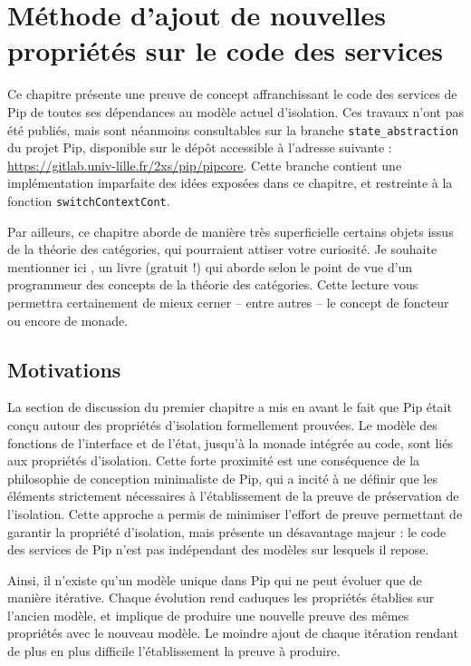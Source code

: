 \chapter{Méthode d'ajout de nouvelles propriétés sur le code des services}

	Ce chapitre présente une preuve de concept affranchissant le code des services de Pip de toutes ses dépendances au modèle actuel d'isolation. Ces travaux n'ont pas été publiés, mais sont néanmoins consultables sur la branche \texttt{state\_abstraction} du projet Pip, disponible sur le dépôt accessible à l'adresse suivante : \url{https://gitlab.univ-lille.fr/2xs/pip/pipcore}. Cette branche contient une implémentation imparfaite des idées exposées dans ce chapitre, et restreinte à la fonction \texttt{switchContextCont}.

	Par ailleurs, ce chapitre aborde de manière très superficielle certains objets issus de la théorie des catégories, qui pourraient attiser votre curiosité. Je souhaite mentionner ici \cite{categorytheoryforprogrammers}, un livre (gratuit !) qui aborde selon le point de vue d'un programmeur des concepts de la théorie des catégories. Cette lecture vous permettra certainement de mieux cerner -- entre autres -- le concept de foncteur ou encore de monade.

	\section{Motivations}

	La section de discussion du premier chapitre a mis en avant le fait que Pip était conçu autour des propriétés d'isolation formellement prouvées. Le modèle des fonctions de l'interface et de l'état, jusqu'à la monade intégrée au code, sont liés aux propriétés d'isolation. Cette forte proximité est une conséquence de la philosophie de conception minimaliste de Pip, qui a incité à ne définir que les éléments strictement nécessaires à l'établissement de la preuve de préservation de l'isolation. Cette approche a permis de minimiser l'effort de preuve permettant de garantir la propriété d'isolation, mais présente un désavantage majeur : le code des services de Pip n'est pas indépendant des modèles sur lesquels il repose.

	Ainsi, il n'existe qu'un modèle unique dans Pip qui ne peut évoluer que de manière itérative. Chaque évolution rend caduques les propriétés établies sur l'ancien modèle, et implique de produire une nouvelle preuve des mêmes propriétés avec le nouveau modèle. Le moindre ajout de chaque itération rendant de plus en plus difficile l'établissement la preuve à produire.

